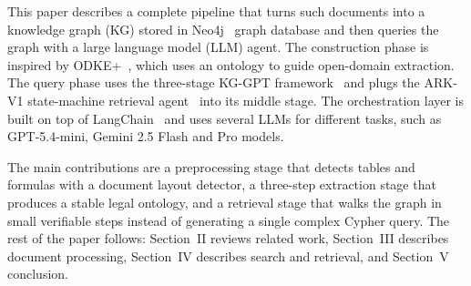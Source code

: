 \documentclass[conference]{IEEEtran}
\begin{document}
This paper describes a complete pipeline that turns such documents into a knowledge graph (KG) stored in Neo4j~\cite{b3} graph database and then queries the graph with a large language model (LLM) agent. The construction phase is inspired by ODKE+~\cite{odkeplus2025}, which uses an ontology to guide open-domain extraction. The query phase uses the three-stage {KG-GPT framework}~\cite{kggpt2023} and plugs the {ARK-V1 state-machine retrieval agent}~\cite{arkv12025} into its middle stage. The orchestration layer is built on top of LangChain~\cite{b4} and uses several LLMs for different tasks, such as GPT-5.4-mini, Gemini 2.5 Flash and Pro models.

The main contributions are a preprocessing stage that detects tables and formulas with a document layout detector, a three-step extraction stage that produces a stable legal ontology, and a retrieval stage that walks the graph in small verifiable steps instead of generating a single complex Cypher query. The rest of the paper follows: Section~II reviews related work, Section~III describes document processing, Section~IV describes search and retrieval, and Section~V conclusion.
\end{document}
